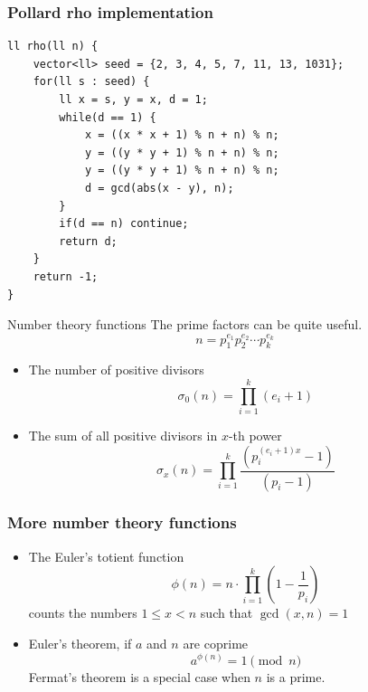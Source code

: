 \documentclass{beamer}
\begin{document}
\begin{frame}
\frametitle{Pollard rho implementation}

\begin{verbatim}
ll rho(ll n) {
    vector<ll> seed = {2, 3, 4, 5, 7, 11, 13, 1031};
    for(ll s : seed) {
        ll x = s, y = x, d = 1;
        while(d == 1) {
            x = ((x * x + 1) % n + n) % n;
            y = ((y * y + 1) % n + n) % n;
            y = ((y * y + 1) % n + n) % n;
            d = gcd(abs(x - y), n);
        }
        if(d == n) continue;
        return d;
    }
    return -1;
}
\end{verbatim}

\end{frame}

\begin{frame}[plain]{Number theory functions}
  \vspace{20pt}
  The prime factors can be quite useful.
  \[
    n = p_1^{e_1}p_2^{e_2}\cdots p_k^{e_k}
  \]
  \begin{itemize}
    \item The number of positive divisors
    \[
      \sigma_0(n) = \prod_{i=1}^k (e_i + 1)
    \]
    \item The sum of all positive divisors in $x$-th power
    \[
      \sigma_x(n) = \prod_{i=1}^k \frac{(p_i^{(e_i + 1)x} - 1)}{(p_i-1)}
    \]
  \end{itemize}
\end{frame}

\begin{frame}[plain]
  \frametitle{More number theory functions}
  \vspace{20pt}
  \begin{itemize}
    \item The Euler's totient function
      \[
      \phi(n) = n \cdot \prod_{i=1}^{k} \left(1 - \frac{1}{p_i}\right)
      \]
      counts the numbers $1\leq x < n$ such that $\gcd(x,n)=1$
    \item Euler's theorem, if $a$ and $n$ are coprime
      \[
        a^{\phi(n)} = 1 \pmod{n}
      \]
      Fermat's theorem is a special case when $n$ is a prime.
  \end{itemize}
\end{frame}
\end{document}
